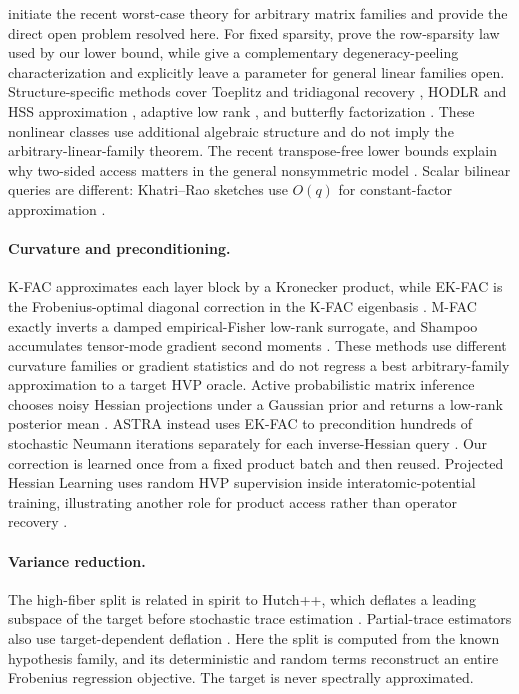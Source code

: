 \documentclass{article}
\theoremstyle{remark}
\newcommand{\1}{\mathbf 1}
\begin{document}
\citet{amsel2026query} initiate the recent worst-case theory for arbitrary matrix families and provide the direct open problem resolved here.  For fixed sparsity, \citet{amsel2026fixed} prove the row-sparsity law used by our lower bound, while \citet{musco2026instance} give a complementary degeneracy-peeling characterization and explicitly leave a parameter for general linear families open.  Structure-specific methods cover Toeplitz and tridiagonal recovery \citep{halikias2024structured,otto2023generic}, HODLR and HSS approximation \citep{chen2024hodlr,amsel2025hss}, adaptive low rank \citep{smith2026adaptive}, and butterfly factorization \citep{persson2026butterfly}.  These nonlinear classes use additional algebraic structure and do not imply the arbitrary-linear-family theorem.  The recent transpose-free lower bounds explain why two-sided access matters in the general nonsymmetric model \citep{halikias2026transpose}.  Scalar bilinear queries are different: Khatri--Rao sketches use $O(q)$ for constant-factor approximation \citep{camano2025structured}.

\paragraph{Curvature and preconditioning.}
K-FAC approximates each layer block by a Kronecker product, while EK-FAC is the Frobenius-optimal diagonal correction in the K-FAC eigenbasis \citep{martens2015kfac,george2018ekfac}.  M-FAC exactly inverts a damped empirical-Fisher low-rank surrogate, and Shampoo accumulates tensor-mode gradient second moments \citep{frantar2021mfac,gupta2018shampoo}.  These methods use different curvature families or gradient statistics and do not regress a best arbitrary-family approximation to a target HVP oracle.  Active probabilistic matrix inference chooses noisy Hessian projections under a Gaussian prior and returns a low-rank posterior mean \citep{deroos2019active}.  ASTRA instead uses EK-FAC to precondition hundreds of stochastic Neumann iterations separately for each inverse-Hessian query \citep{wang2025astra}.  Our correction is learned once from a fixed product batch and then reused.  Projected Hessian Learning uses random HVP supervision inside interatomic-potential training, illustrating another role for product access rather than operator recovery \citep{rodriguez2026projected}.

\paragraph{Variance reduction.}
The high-fiber split is related in spirit to Hutch++, which deflates a leading subspace of the target before stochastic trace estimation \citep{meyer2021hutchpp}.  Partial-trace estimators also use target-dependent deflation \citep{chen2024partial}.  Here the split is computed from the known hypothesis family, and its deterministic and random terms reconstruct an entire Frobenius regression objective.  The target is never spectrally approximated.
\end{document}
